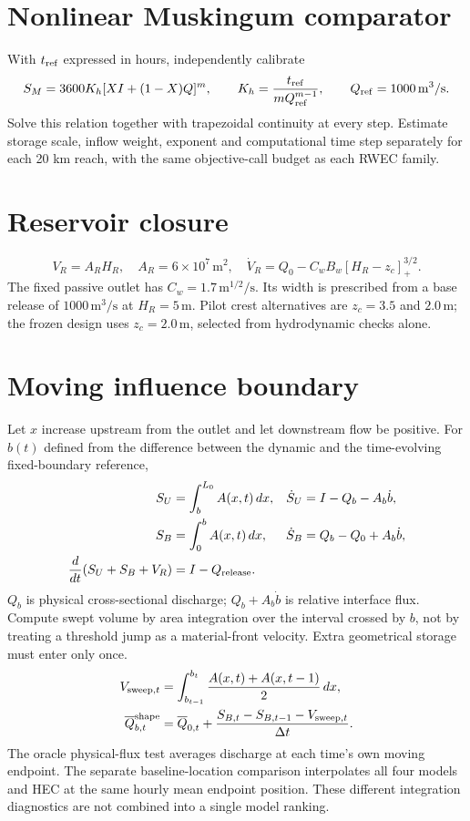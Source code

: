 \documentclass[11pt]{article}
\begin{document}
\section*{Nonlinear Muskingum comparator}
With $t_{\rm ref}$ expressed in hours, independently calibrate
\begin{equation}
S_M=3600K_h[XI+(1-X)Q]^m,\qquad K_h=\frac{t_{\rm ref}}{mQ_{\rm ref}^{m-1}},\qquad Q_{\rm ref}=1000\,\mathrm{m^3/s}.
\end{equation}
Solve this relation together with trapezoidal continuity at every step. Estimate storage scale, inflow weight, exponent and computational time step separately for each 20 km reach, with the same objective-call budget as each RWEC family.
\section*{Reservoir closure}
\begin{equation}
V_R=A_RH_R,\quad A_R=6\times10^7\,\mathrm{m^2},\quad \dot V_R=Q_0-C_wB_w[H_R-z_c]_+^{3/2}.
\end{equation}
The fixed passive outlet has $C_w=1.7\,\mathrm{m^{1/2}/s}$. Its width is prescribed from a base release of $1000\,\mathrm{m^3/s}$ at $H_R=5\,\mathrm m$. Pilot crest alternatives are $z_c=3.5$ and $2.0\,\mathrm m$; the frozen design uses $z_c=2.0\,\mathrm m$, selected from hydrodynamic checks alone.
\section*{Moving influence boundary}
Let $x$ increase upstream from the outlet and let downstream flow be positive. For $b(t)$ defined from the difference between the dynamic and the time-evolving fixed-boundary reference,
\begin{align}
S_U&=\int_b^{L_0}A(x,t)\,dx, & \dot S_U&=I-Q_b-A_b\dot b,\\
S_B&=\int_0^bA(x,t)\,dx, & \dot S_B&=Q_b-Q_0+A_b\dot b,\\
\frac{d}{dt}(S_U+S_B+V_R)&=I-Q_{\rm release}.
\end{align}
$Q_b$ is physical cross-sectional discharge; $Q_b+A_b\dot b$ is relative interface flux. Compute swept volume by area integration over the interval crossed by $b$, not by treating a threshold jump as a material-front velocity. Extra geometrical storage must enter only once.
\begin{align}
V_{{\rm sweep},t}&=\int_{b_{t-1}}^{b_t}\frac{A(x,t)+A(x,t-1)}2\,dx,\\
\overline Q_{b,t}^{\rm shape}&=\overline Q_{0,t}+\frac{S_{B,t}-S_{B,t-1}-V_{{\rm sweep},t}}{\Delta t}.
\end{align}
The oracle physical-flux test averages discharge at each time's own moving endpoint. The separate baseline-location comparison interpolates all four models and HEC at the same hourly mean endpoint position. These different integration diagnostics are not combined into a single model ranking.
\end{document}
